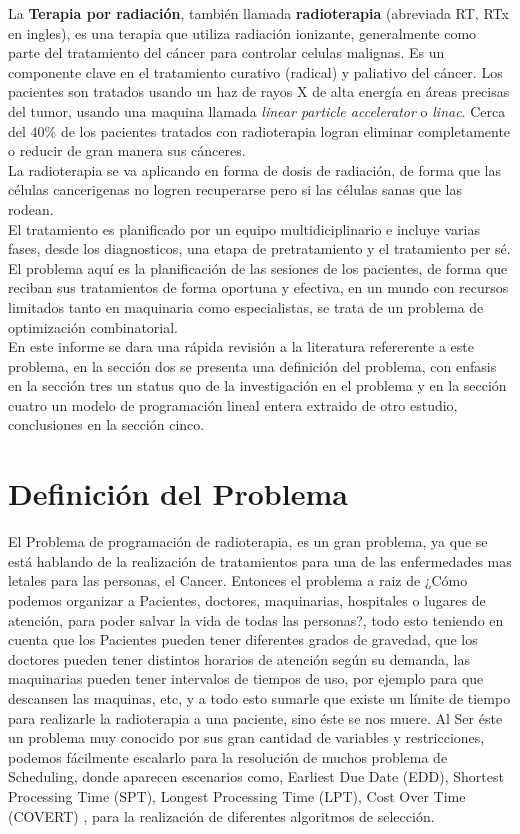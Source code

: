 \documentclass[letter, 10pt]{article}
\begin{document}
La \textbf{Terapia por radiación}, también llamada \textbf{radioterapia} (abreviada RT, RTx en ingles), es una terapia que utiliza radiación ionizante, generalmente como parte del tratamiento del cáncer para controlar celulas malignas. Es un componente clave en el tratamiento curativo (radical) y paliativo del cáncer. Los pacientes son tratados usando un haz de rayos X de alta energía en áreas precisas del tumor, usando una maquina llamada \emph{linear particle accelerator} o \emph{linac}. Cerca del $40\%$ de los pacientes tratados con radioterapia logran eliminar completamente o reducir de gran manera sus cánceres.
\\La radioterapia se va aplicando en forma de dosis de radiación, de forma que las células cancerigenas no logren recuperarse pero si las células sanas que las rodean.
\\El tratamiento es planificado por un equipo multidiciplinario e incluye varias fases, desde los diagnosticos, una etapa de pretratamiento y el tratamiento per sé.
\\El problema aquí es la planificación de las sesiones de los pacientes, de forma que reciban sus tratamientos de forma oportuna y efectiva, en un mundo con recursos limitados tanto en maquinaria como especialistas, se trata de un problema de optimización combinatorial.
\\En este informe se dara una rápida revisión a la literatura refererente a este problema, en la sección dos se presenta una definición del problema, con enfasis en la sección tres un status quo de la investigación en el problema y en la sección cuatro un modelo de programación lineal entera extraido de otro estudio, conclusiones en la sección cinco.

\section{Definici\'on del Problema}

El Problema de programación de radioterapia, es un gran problema, ya que se está hablando de la realización de tratamientos para una de las enfermedades mas letales para las personas, el Cancer. Entonces el problema a raiz de ¿Cómo podemos organizar a Pacientes, doctores, maquinarias, hospitales o lugares de atención, para poder salvar la vida de todas las personas?, todo esto teniendo en cuenta que los Pacientes pueden tener diferentes grados de gravedad, que los doctores pueden tener distintos horarios de atención según su demanda, las maquinarias pueden tener intervalos de tiempos de uso, por ejemplo para que descansen las maquinas, etc, y a todo esto sumarle que existe un límite de tiempo para realizarle la radioterapia a una paciente, sino éste se nos muere. Al Ser éste un problema muy conocido por sus gran cantidad de variables y restricciones, podemos fácilmente escalarlo para la resolución de muchos problema de Scheduling, donde aparecen escenarios como, Earliest Due Date (EDD), Shortest Processing Time (SPT), Longest Processing Time (LPT), Cost Over Time (COVERT) \cite{TKapamara2014}, para la realización de diferentes algoritmos de selección.
\end{document}
